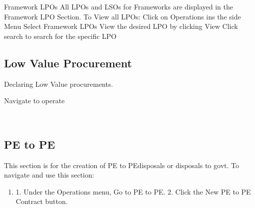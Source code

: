 \documentclass [12pt]{book}
\begin{document}
\begin{enumerate}
\begin{enumerate}
Framework LPOs 
All LPOs and LSOs for Frameworks are displayed in the Framework LPO Section. 
To View all LPOs:
Click on Operations ins the side Menu 
Select Framework LPOs 
View the desired LPO by clicking View
Click search to search for the specific LPO

\subsection{Low Value Procurement}
Declaring Low Value procurements.

Navigate to operate
 

% 
 
 
 
% 


\subsection{PE to PE}
This section is for the creation of PE to PEdisposals or disposals to govt.
To navigate and use this section:
\begin{enumerate}
    \item 
1.	Under the Operations menu, Go to PE to PE.
2.	Click the New PE to PE Contract button.
 

\end{enumerate}
\end{enumerate}
\end{enumerate}
\end{document}

